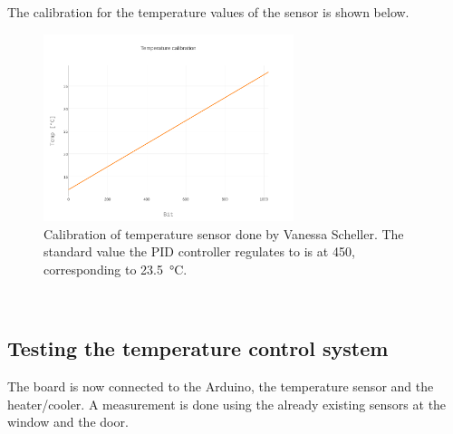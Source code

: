 \documentclass[12pt]{scrartcl}
\begin{document}
      \noindent The calibration for the temperature values of the sensor is shown
      below.
      \begin{figure}[h]
        \centering
        \includegraphics[width = 0.65\textwidth]{./plots/plot_image(4)}
        \caption{Calibration of temperature sensor done by Vanessa Scheller.
        The standard value the PID controller regulates to is at 450,
        corresponding to 23.5~°C.}
        \label{fig10}
      \end{figure}
      \\
    \subsection{Testing the temperature control system}
      The board is now connected to the Arduino, the temperature sensor and the
      heater/cooler.
      A measurement is done using the already existing sensors at the window and
      the door.
\end{document}
